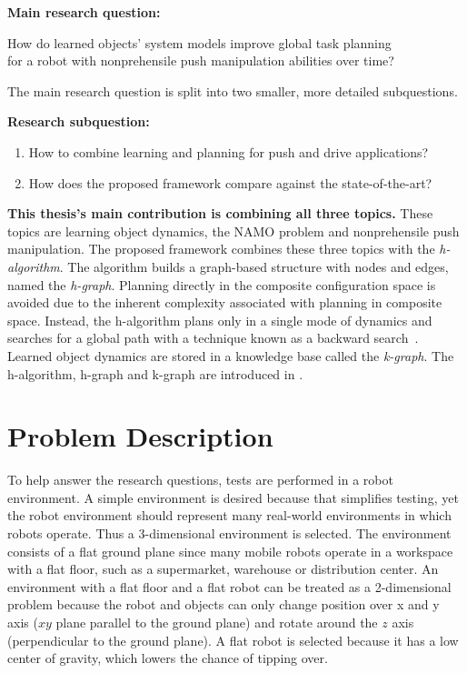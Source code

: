 \textbf{Main research question:}
\begin{center}%
\label{researchquestion:main}
\large
How do learned objects' system models improve global task planning\\for a robot with nonprehensile push manipulation abilities over time?
\end{center}

The main research question is split into two smaller, more detailed subquestions.\bs

\textbf{Research subquestion:}
\begin{enumerate}
    \item\label{researchsubquestion:does_it_work} How to combine learning and planning for push and drive applications?
    \item\label{researchsubquestion:does_it_compare} How does the proposed framework compare against the state-of-the-art?
\end{enumerate}

\textbf{This thesis's main contribution is combining all three topics.} These topics are learning object dynamics, the \ac{NAMO} problem and nonprehensile push manipulation. The proposed framework combines these three topics with the \textit{\acl{h-algorithm}}. The algorithm builds a graph-based structure with nodes and edges, named the \textit{\acl{h-graph}}. Planning directly in the composite configuration space is avoided due to the inherent complexity associated with planning in composite space. Instead, the \acl{h-algorithm} plans only in a single mode of dynamics and searches for a global path with a technique known as a backward search~\cite{krontiris_dealing_2015}. Learned object dynamics are stored in a knowledge base called the \textit{\acl{k-graph}}. The \acl{h-algorithm}, \acl{h-graph} and \acl{k-graph} are introduced in .\bs

\section{Problem Description}%
\label{sec:problem_description}
To help answer the research questions, tests are performed in a robot environment. A simple environment is desired because that simplifies testing, yet the robot environment should represent many real-world environments in which robots operate. Thus a 3-dimensional environment is selected. The environment consists of a flat ground plane since many mobile robots operate in a workspace with a flat floor, such as a supermarket, warehouse or distribution center. An environment with a flat floor and a flat robot can be treated as a 2-dimensional problem because the robot and objects can only change position over \gls{x} and \gls{y} axis ($xy$ plane parallel to the ground plane) and rotate around the $z$ axis (perpendicular to the ground plane). A flat robot is selected because it has a low center of gravity, which lowers the chance of tipping over.

